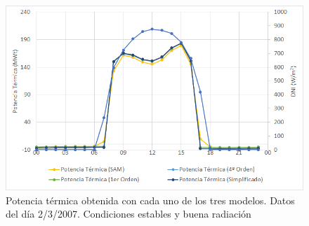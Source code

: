 \begin{figure}[H]
\includegraphics[width=0.9\linewidth]{images/potencias_modelos.png}
\caption[Potencia térmica obtenida con cada uno de los tres modelos en un día de condiciones estables]{Potencia térmica obtenida con cada uno de los tres modelos. Datos del día 2/3/2007. Condiciones estables y buena radiación} 
\label{fig:potencias_modelos}
\end{figure}

